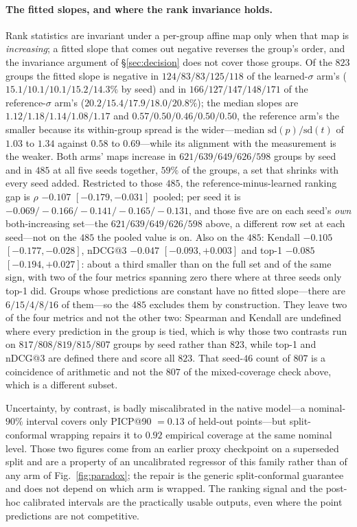 \paragraph{The fitted slopes, and where the rank invariance holds.} Rank statistics are invariant
under a per-group affine map only when that map is \emph{increasing}; a fitted slope that comes out
negative reverses the group's order, and the invariance argument of \S\ref{sec:decision} does not
cover those groups. Of the $823$ groups the fitted slope is negative in $124/83/83/125/118$ of the
learned-$\sigma$ arm's ($15.1/10.1/10.1/15.2/14.3\%$ by seed) and in $166/127/147/148/171$ of the
reference-$\sigma$ arm's ($20.2/15.4/17.9/18.0/20.8\%$); the median slopes are
$1.12/1.18/1.14/1.08/1.17$ and $0.57/0.50/0.46/0.50/0.50$, the
reference arm's the smaller because its within-group spread is the wider---median $\mathrm{sd}(p)/
\mathrm{sd}(t)$ of $1.03$ to $1.34$ against $0.58$ to $0.69$---while its alignment with the
measurement is the weaker.
Both arms' maps increase in $621/639/649/626/598$ groups by seed and in $485$ at all five seeds
together, $59\%$ of the groups, a set that shrinks with every seed added.
Restricted to those $485$, the reference-minus-learned ranking gap is $\rho$ $-0.107$
$[-0.179,-0.031]$ pooled; per seed it is $-0.069/{-}0.166/{-}0.141/{-}0.165/{-}0.131$, and those five
are on each seed's \emph{own} both-increasing set---the $621/639/649/626/598$ above, a different row
set at each seed---not on the $485$ the pooled value is on. Also on the $485$: Kendall $-0.105$
$[-0.177,-0.028]$,
nDCG@3 $-0.047$ $[-0.093,+0.003]$ and top-1 $-0.085$ $[-0.194,+0.027]$: about a third smaller than
on the full set and of the same sign, with two of the four metrics spanning zero there where at
three seeds only top-1 did. Groups whose predictions are constant have no fitted slope---there are
$6/15/4/8/16$ of
them---so the $485$ excludes them by construction. They leave two of the four metrics and not the
other two: Spearman and Kendall are undefined where every prediction in the group is tied, which is
why those two contrasts run on $817/808/819/815/807$ groups by seed rather than $823$, while top-1 and
nDCG@3 are defined there and score all $823$. That seed-$46$ count of $807$ is a coincidence of
arithmetic and not the $807$ of the mixed-coverage check above, which is a different subset.

Uncertainty, by contrast, is badly miscalibrated in the native model---a nominal-$90\%$ interval
covers only PICP@90 $=0.13$ of held-out points---but split-conformal wrapping repairs it to $0.92$
empirical coverage at the same nominal level. Those two figures come from an earlier proxy
checkpoint on a superseded split and are a property of an uncalibrated regressor of this family
rather than of any arm of Fig.~\ref{fig:paradox}; the repair is the generic split-conformal
guarantee and does not depend on which arm is wrapped. The ranking signal and the post-hoc
calibrated intervals are the practically usable outputs, even where the point predictions are not
competitive.
